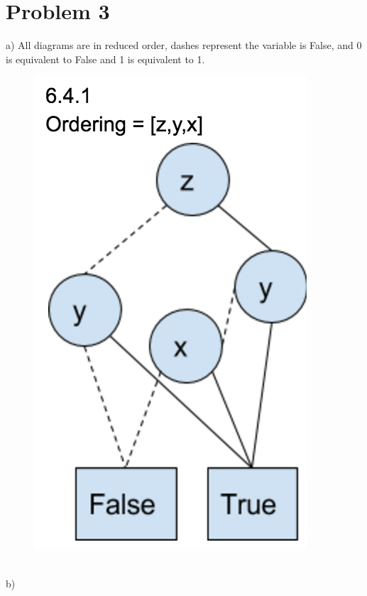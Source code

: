 \documentclass{article}
\begin{document}
\section{Problem 3}
a)  All diagrams are in reduced order, dashes represent the variable is False, and 0 is equivalent to False and 1 is equivalent to 1.
\begin{figure}[!htb]
  \includegraphics[width=\linewidth]{3a.png}
\endminipage\hfill
\end{figure}
\\b)
\end{document}
